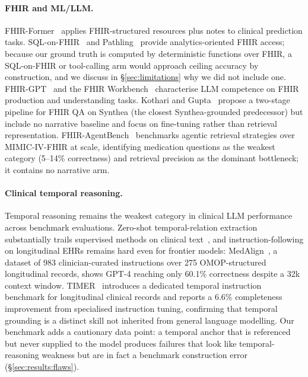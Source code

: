 \paragraph{FHIR and ML/LLM.}
FHIR-Former~\citep{engelke2025fhirformer} applies FHIR-structured resources plus notes to
clinical prediction tasks.  SQL-on-FHIR~\citep{grimes2025sqlonfhir} and Pathling~\citep{grimes2022pathling}
provide analytics-oriented FHIR access; because our ground truth is computed by
deterministic functions over FHIR, a SQL-on-FHIR or tool-calling arm would approach
ceiling accuracy by construction, and we discuss in \S\ref{sec:limitations} why we did
not include one.
FHIR-GPT~\citep{li2024fhirgpt} and the FHIR Workbench~\citep{idrissiyaghir2025fhirworkbench}
characterise LLM competence on FHIR production and understanding tasks.
Kothari and Gupta~\citep{kothari2025patientqa} propose a two-stage pipeline for FHIR
QA on Synthea (the closest Synthea-grounded predecessor) but include no narrative baseline
and focus on fine-tuning rather than retrieval representation.
FHIR-AgentBench~\citep{lee2025fhiragentbench} benchmarks agentic retrieval strategies over
MIMIC-IV-FHIR at scale, identifying medication questions as the weakest category
(5--14\% correctness) and retrieval precision as the dominant bottleneck; it contains no
narrative arm.

\paragraph{Clinical temporal reasoning.}
Temporal reasoning remains the weakest category in clinical LLM performance across benchmark
evaluations. Zero-shot temporal-relation extraction substantially trails supervised methods
on clinical text~\citep{yuan2023zeroshot}, and instruction-following on longitudinal EHRs
remains hard even for frontier models: MedAlign~\citep{fleming2024medalign}, a dataset of
983 clinician-curated instructions over 275 OMOP-structured longitudinal records, shows
GPT-4 reaching only 60.1\% correctness despite a 32k context window.
TIMER~\citep{cui2025timer} introduces a dedicated temporal instruction benchmark for
longitudinal clinical records and reports a 6.6\% completeness improvement from specialised
instruction tuning, confirming that temporal grounding is a distinct skill not inherited
from general language modelling.  Our benchmark adds a cautionary data point: a temporal
anchor that is referenced but never supplied to the model produces failures that look
like temporal-reasoning weakness but are in fact a benchmark construction error
(\S\ref{sec:results:flaws}).

